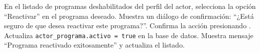 \begin{UCtrayectoria}
	\UCpaso[\UCactor] En el listado de programas deshabilitados del perfil del actor, selecciona la opción ``Reactivar'' en el programa deseado.
	\UCpaso Muestra un diálogo de confirmación: ``¿Está seguro de que desea reactivar este programa?''.
	\UCpaso[\UCactor] Confirma la acción presionando . 
	\UCpaso Actualiza \texttt{actor\_programa.activo = true} en la base de datos.
	\UCpaso Muestra mensaje ``Programa reactivado exitosamente'' y actualiza el listado.
\end{UCtrayectoria}
